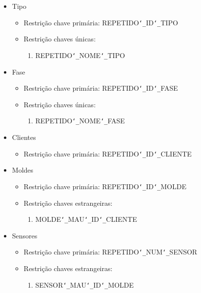 \documentclass[11pt,twoside,a4paper]{report}
\begin{document}
\begin{itemize}[noitemsep]
	\item Tipo
	\begin{itemize}[noitemsep]
		\item Restrição chave primária: REPETIDO\texttt{\char`_}ID\texttt{\char`_}TIPO
		\item Restrição chaves únicas:
		\begin{enumerate}
			\item REPETIDO\texttt{\char`_}NOME\texttt{\char`_}TIPO
		\end{enumerate}
	\end{itemize}
	\item Fase
	\begin{itemize}[noitemsep]
		\item Restrição chave primária: REPETIDO\texttt{\char`_}ID\texttt{\char`_}FASE
		\item Restrição chaves únicas:
		\begin{enumerate}
			\item REPETIDO\texttt{\char`_}NOME\texttt{\char`_}FASE
		\end{enumerate}
	\end{itemize}
	\item Clientes
	\begin{itemize}[noitemsep]
		\item Restrição chave primária: REPETIDO\texttt{\char`_}ID\texttt{\char`_}CLIENTE
	\end{itemize}
	\item Moldes
	\begin{itemize}[noitemsep]
		\item Restrição chave primária: REPETIDO\texttt{\char`_}ID\texttt{\char`_}MOLDE
		\item Restrição chaves estrangeiras:
		\begin{enumerate}
			\item MOLDE\texttt{\char`_}MAU\texttt{\char`_}ID\texttt{\char`_}CLIENTE
		\end{enumerate}
	\end{itemize}
	\item Sensores
	\begin{itemize}[noitemsep]
		\item Restrição chave primária: REPETIDO\texttt{\char`_}NUM\texttt{\char`_}SENSOR
		\item Restrição chaves estrangeiras:
		\begin{enumerate}
			\item SENSOR\texttt{\char`_}MAU\texttt{\char`_}ID\texttt{\char`_}MOLDE

\end{enumerate}
\end{itemize}
\end{itemize}
\end{document}
